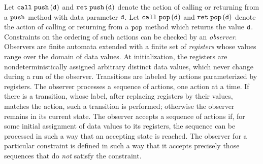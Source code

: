 Let $\mathtt{call}\; \tt push\left(\tt d\right)$ and $\mathtt{ret}\; \tt push\left(\tt d\right)$ denote the
action of calling or returning from a ${\tt push}$ method with data parameter ${\tt d}$.
Let $\mathtt{call}\; \tt pop\left(\tt d\right)$ and $\mathtt{ret}\; \tt pop\left(\tt d\right)$ denote the
action of calling or returning from a ${\tt pop}$ method which returns
the value ${\tt d}$.
Constraints on the ordering of such actions can be
checked by an {\em observer}.
%
Observers are
finite automata extended with a finite set of {\em registers} whose values range
over the domain of data values.
%
At initialization,
the registers are nondeterministically
assigned arbitrary distinct data values, which never change
during a run of the observer. 
%
Transitions are labeled by actions parameterized by registers.
The observer processes a sequence of actions, one action at a time.
If there is a transition, whose label, after replacing registers by their
values, matches the action, such a transition is performed; otherwise
the observer remains in its current state.
%
The observer accepts a sequence of actions
if, for some initial assignment of data values to its registers, the sequence
can be processed in such a way that an accepting state is reached.
The observer for a particular constraint is defined in such a way that it
accepts precisely those sequences  that do {\em not} satisfy the constraint.


